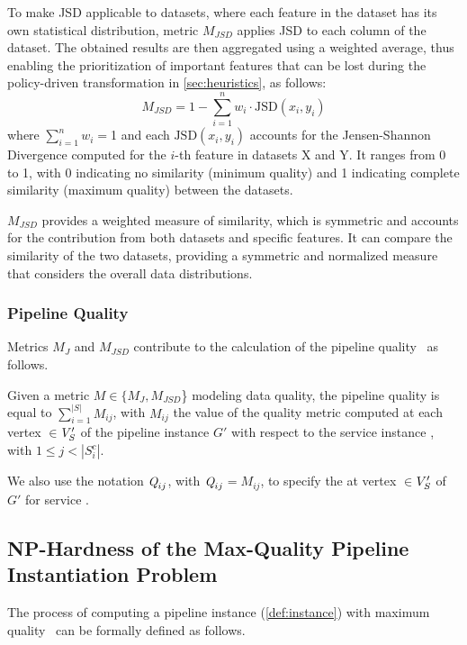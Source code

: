 To make JSD applicable to datasets, where each feature in the dataset has its own statistical distribution, metric $M_{JSD}$ applies JSD to each column of the dataset. The obtained results are then aggregated using a weighted average, thus enabling the prioritization of important features that can be lost during the policy-driven transformation in \cref{sec:heuristics}, as follows: \[M_{JSD} = 1 - \sum_{i=1}^n w_i \cdot \text{JSD}(x_i,y_i)\]
where $\sum_{i=1}^n w_i$$=$1 and each \(\text{JSD}(x_i,y_i)\) accounts for the Jensen-Shannon Divergence computed for the \(i\)-th feature in datasets X and Y. It ranges from 0 to 1, with 0 indicating no similarity (minimum quality) and 1 indicating complete similarity (maximum quality) between the datasets.

$M_{JSD}$ provides a weighted measure of similarity, which is symmetric and accounts for the contribution from both datasets and specific features. It can compare the similarity of the two datasets, providing a symmetric and normalized measure that considers the overall data distributions.


\subsubsection{Pipeline Quality}
Metrics $M_J$ and $M_{JSD}$ contribute to the calculation of the pipeline quality \q\ as follows. 
\vspace{0.5em}

\begin{definition}[\emph{\PipQuality}]\label{def:quality}
Given a metric $M$$\in$$\{M_J,M_{JSD}$\} modeling data quality, the pipeline quality \q is equal to $\sum_{i=1}^{|S|}M_{ij}$, with $M_{ij}$ the value of the quality metric computed at each vertex $\in$$V'_S$ of the pipeline instance $G'$ with respect to the service instance , with $1 \leq j <  |S^c_{i}|$.
\end{definition}

\vspace{0.5em}
We also use the notation $\textit{Q}_{ij}$, with $\textit{Q}_{ij}$$=$$M_{ij}$, to specify the \quality at vertex $\in$$V'_S$ of $G'$ for service .

\subsection{NP-Hardness of the Max-Quality Pipeline Instantiation Problem}\label{sec:nphard}
The process of computing a pipeline instance (\cref{def:instance}) with maximum quality \q\ can be formally defined as follows.
\vspace{0.5em}

